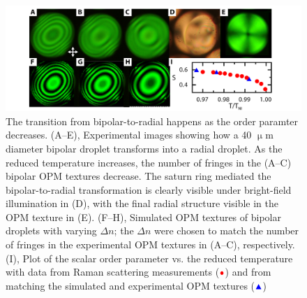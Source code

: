 \begin{figure}
  \centering
  \includegraphics{figures/C7/Ch7-Figs_Emulsion_Trans.png}
  \caption{The transition from bipolar-to-radial happens as the order paramter decreases.
    (A--E), Experimental images showing how a 40 $\upmu$m diameter bipolar droplet transforms into a radial droplet.
    As the reduced temperature increases, the number of fringes in the (A--C) bipolar OPM textures decrease.
    The saturn ring mediated the bipolar-to-radial transformation is clearly visible under bright-field illumination in (D), with the final radial structure visible in the OPM texture in (E).
    (F--H), Simulated OPM textures of bipolar droplets with varying $\Delta n$; the $\Delta n$ were chosen to match the number of fringes in the experimental OPM textures in (A--C), respectively.
    (I), Plot of the scalar order parameter vs. the reduced temperature with data from Raman scattering measurements (${\color{red} \bullet}$) and from matching the simulated and experimental OPM textures (${\color{blue} \blacktriangle}$)
     }\label{f:7-Emulsion_Trans}
\end{figure}

